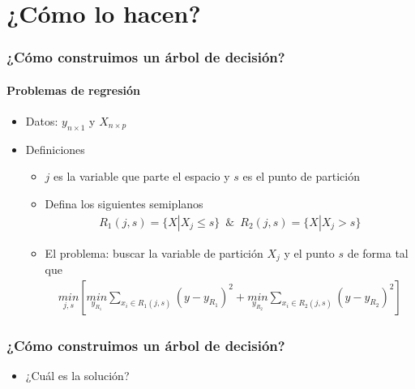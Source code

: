 \documentclass[
  shownotes,
  xcolor={svgnames},
  hyperref={colorlinks,citecolor=DarkBlue,linkcolor=andesred,urlcolor=DarkBlue}
  , aspectratio=169]{beamer}
\begin{document}
\section{¿Cómo lo hacen?}

\begin{frame}[fragile]
\frametitle{¿Cómo construimos un árbol de decisión?}
\framesubtitle{Problemas de regresión}

\begin{itemize}
\item Datos: $y_{n\times 1}$  y $X_{n\times p}$ 
\medskip
\item Definiciones
\medskip
\begin{itemize}
\item $j$ es la variable que parte el espacio y  $s$ es el punto de partición
\medskip
\item Defina los siguientes semiplanos
\begin{align}
R_1(j,s)=\{X|X_j\leq s\} \,\,\, \& \,\,\, R_2(j,s)=\{X|X_j > s\}
\end{align}
\item El problema: buscar la variable de partición $X_j$ y el punto $s$ de forma tal que 
\begin{align}
\underset{j,s}{min} \left[ \underset{y_{R_1}}{min}\sum_{x_i\in R_1(j,s)}(y-y_{R_1})^2+ \underset{y_{R_2}}{min}\sum_{x_i\in R_2(j,s)}(y-y_{R_2})^2\right]
\end{align}
\end{itemize}
\end{itemize}
\end{frame}
\begin{frame}[t]
\frametitle{¿Cómo construimos un árbol de decisión?}

  \begin{itemize}
\item ¿Cuál es la solución?

\end{itemize}
\end{frame}
\end{document}
